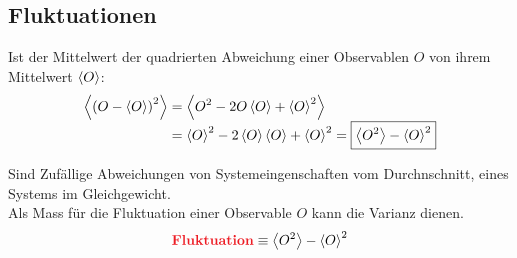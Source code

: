 \subsection{Fluktuationen}
\begin{defnbox}\nospacing
  \begin{defn}[Varianz]
    Ist der Mittelwert der quadrierten Abweichung einer Observablen $O$ von ihrem Mittelwert $\left\langle O\right\rangle$:
    \begin{align}
      \obs{\left(O-\obs{O}\right)^2}&=\obs{O^2-2O\obs{O}+\obs{O}^2}\nalign
                                      &=\obs{O}^2-2\obs{O}\obs{O}+\obs{O}^2=\boxed{\obs{O^2}-\obs{O}^2}\nonumber
    \end{align}
  \end{defn}
\end{defnbox}
\begin{defnbox}\nospacing
  \begin{defn}[Fluktuationen]
    Sind Zufällige Abweichungen von Systemeingenschaften vom Durchnschnitt, eines Systems im Gleichgewicht.\\
    Als Mass für die Fluktuation einer Observable $O$ kann die Varianz dienen.
    \begin{align}
      \text{\rdb{Fluktuation}}\equiv\obs{O^2}-\obs{O}^2
    \end{align}
  \end{defn}
\end{defnbox}
